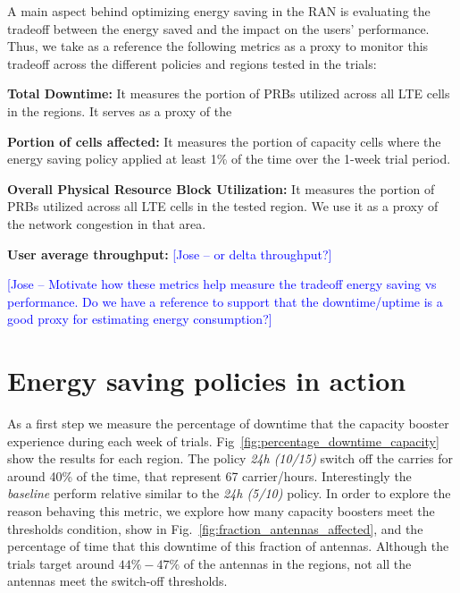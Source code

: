 \documentclass[10pt,sigconf,letterpaper,anonymous,nonacm]{acmart}
\newcommand{\js}[1]{\textcolor{blue}{[Jose -- #1]}}
\begin{document}
A main aspect behind optimizing energy saving in the RAN is evaluating the tradeoff between the energy saved and the impact on the users' performance\cite{Tan2022}. Thus, we take as a reference the following metrics as a proxy to monitor this tradeoff across the different policies and regions tested in the trials: 

\textbf{Total Downtime:} It measures the portion of PRBs utilized across all LTE cells in the regions. It serves as a proxy of the 

\textbf{Portion of cells affected:} It measures the portion of capacity cells where the energy saving policy applied at least 1\% of the time over the 1-week trial period.

\textbf{Overall Physical Resource Block Utilization:} It measures the portion of PRBs utilized across all LTE cells in the tested region. We use it as a proxy of the network congestion in that area.

\textbf{User average throughput:} \js{or delta throughput?}

\js{Motivate how these metrics help measure the tradeoff energy saving vs performance. Do we have a reference to support that the downtime/uptime is a good proxy for estimating energy consumption?}



\section{Energy saving policies in action}

As a first step we measure the percentage of downtime that the capacity booster experience during each week of trials. Fig~\ref{fig:percentage_downtime_capacity} show the results for each region. The policy \textit{24h (10/15)} switch off the carries for around 40\% of the time, that represent 67 carrier/hours. Interestingly the \textit{baseline} perform  relative similar to the \textit{24h (5/10)} policy.
In order to explore the reason behaving this metric, we explore how many capacity boosters meet the thresholds condition, show in Fig.~\ref{fig:fraction_antennas_affected}, and the percentage of time that this downtime of this fraction of antennas. Although the trials target around $44\%-47\%$ of the antennas in the regions, not all the antennas meet the switch-off thresholds.
\end{document}
